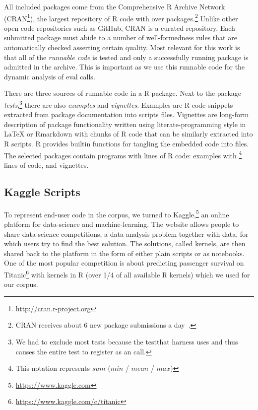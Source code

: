 \documentclass[conference]{IEEEtran}
\begin{document}
All included packages come from the Comprehensive R Archive Network
(CRAN\footnote{\url{http://cran.r-project.org}}), the largest repository of R
code with over \CorpusAllCranRnd packages.\footnote{CRAN receives about 6 new
  package submissions a day~\cite{Ligges2017}.} Unlike other open code
repositories such as GitHub, CRAN is a curated repository. Each submitted
package must abide to a number of well-formedness rules that are automatically
checked asserting certain quality. Most relevant for this work is that all of
the \emph{runnable code} is tested and only a successfully running package is
admitted in the archive. This is important as we use this runnable code for the
dynamic analysis of eval calls.

There are three sources of runnable code in a R package. Next to the package
\emph{tests},\footnote{We had to exclude most tests because the {testthat}
  harness uses \eval and thus causes the entire test to register as an \eval
  call.} there are also \emph{examples} and \emph{vignettes}. Examples are R
code snippets extracted from package documentation into scripts files.
Vignettes are long-form description of package functionality written using
literate-programming style in \LaTeX\xspace or Rmarkdown with chunks of R
code that can be similarly extracted into R scripts. R provides builtin
functions for tangling the embedded code into files.  The selected packages
contain \CorpusPackagePrograms programs with \CorpusPackageProgramsCodeRnd
lines of R code: \CorpusExamplesProgramsRnd examples with
\footnote{This notation represents $sum$
  ($min$ / $mean$ / $max$)} lines of code, and \CorpusVignettesProgramsRnd
vignettes.%

\subsection{Kaggle Scripts}

To represent end-user code in the corpus, we turned to
Kaggle,\footnote{\url{https://www.kaggle.com}} an online platform for
data-science and machine-learning. The website allows people to share
data-science competitions, a data-analysis problem together with data, for
which users try to find the best solution. The solutions, called {kernels},
are then shared back to the platform in the form of either plain scripts or
as notebooks.  One of the most popular competition is about predicting
passenger survival on
Titanic\footnote{\url{https://www.kaggle.com/c/titanic}} with \CorpusKaggle
kernels in R (over 1/4 of all available R kernels) which we used for our
corpus.
\end{document}
